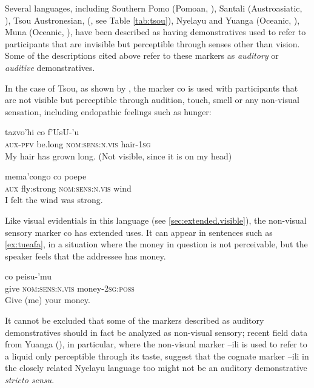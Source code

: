 \documentclass[oneside,a4paper,11pt]{article}
\newcommand{\ipa}[1]{{\phon \mbox{#1}}} %
\begin{document}
Several languages, including Southern Pomo (Pomoan, \citealt[37, ft]{oswalt86evidential}), Santali (Austroasiatic, \citealt[42-44]{neukom01santali}), Tsou Austronesian, (\citealt{yang00tsou.case}, see Table \ref{tab:tsou}), Nyelayu and Yuanga (Oceanic, \citealt[42-44]{neukom01santali}), Muna  (Oceanic, \citealt{berg97deixis.muna}), have been described as having  demonstratives used to refer to participants that are invisible but perceptible through senses other than vision. Some of the descriptions cited above refer to these markers as \textit{auditory} or \textit{auditive} demonstratives. 

In the case of Tsou, as shown by \citet[50-1]{yang00tsou.case}, the marker \ipa{co} is used with participants that are not visible but perceptible through audition, touch, smell or any non-visual sensation, including endopathic feelings such as hunger:


\begin{exe}
\ex 
\gll \ipa{mi-cu} \ipa{tazvo'hi} \ipa{co} \ipa{f'UsU-'u} \\
\textsc{aux-pfv} be.long \textsc{nom:sens:n.vis} hair-\textsc{1sg} \\
\glt My hair has grown long. (Not visible, since it is on my head)
\end{exe}

\begin{exe}
\ex 
\gll \ipa{mo} \ipa{mema'congo} \ipa{co} \ipa{poepe} \\
\textsc{aux} fly:strong \textsc{nom:sens:n.vis} wind \\
\glt I felt the wind was strong.
\end{exe}

Like visual evidentials in this language (see \ref{sec:extended.visible}), the non-visual sensory marker \ipa{co} has extended uses. It can appear in sentences such as \ref{ex:tueafa}, in a situation where the money in question is not perceivable, but the speaker feels that the addressee has money.

\begin{exe}
\ex  \label{ex:tueafa}
\gll \ipa{tueafa}   \ipa{co} \ipa{peisu-'mu} \\
give \textsc{nom:sens:n.vis} money-\textsc{2sg:poss} \\
\glt Give (me) your money.
\end{exe}

It cannot be excluded that some of the markers described as auditory demonstratives should in fact be analyzed as non-visual sensory; recent field data from Yuanga (\citealt{bril-yuanga}), in particular, where the non-visual marker  \ipa{--ili} is used to refer to a liquid only perceptible through its taste, suggest that the cognate marker \ipa{--ili} in the closely related Nyelayu language too might not be an auditory demonstrative \textit{stricto sensu}.
\end{document}
